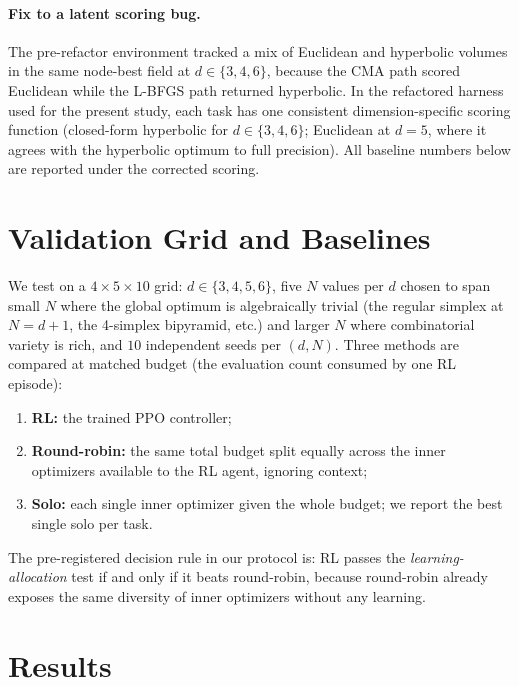 \documentclass[11pt]{article}
\begin{document}
\paragraph{Fix to a latent scoring bug.}
The pre-refactor environment tracked a mix of Euclidean and
hyperbolic volumes in the same node-best field at $d \in
\{3, 4, 6\}$, because the CMA path scored Euclidean while the
L-BFGS path returned hyperbolic.  In the refactored harness used
for the present study, each task has one consistent dimension-specific
scoring function (closed-form hyperbolic for $d \in \{3, 4, 6\}$;
Euclidean at $d = 5$, where it agrees with the hyperbolic optimum
to full precision).  All baseline numbers below are reported under
the corrected scoring.

\section{Validation Grid and Baselines}

We test on a $4 \times 5 \times 10$ grid: $d \in \{3, 4, 5, 6\}$,
five $N$ values per $d$ chosen to span small $N$ where the global
optimum is algebraically trivial (the regular simplex at $N = d+1$,
the 4-simplex bipyramid, etc.) and larger $N$ where combinatorial
variety is rich, and $10$ independent seeds per $(d, N)$.  Three
methods are compared at matched budget (the evaluation count
consumed by one RL episode):
\begin{enumerate}[label=(\roman*)]
\item \textbf{RL:} the trained PPO controller;
\item \textbf{Round-robin:} the same total budget split equally
      across the inner optimizers available to the RL agent,
      ignoring context;
\item \textbf{Solo:} each single inner optimizer given the whole
      budget; we report the best single solo per task.
\end{enumerate}
The pre-registered decision rule in our protocol is: RL passes the
\emph{learning-allocation} test if and only if it beats round-robin,
because round-robin already exposes the same diversity of inner
optimizers without any learning.

\section{Results}
\end{document}
